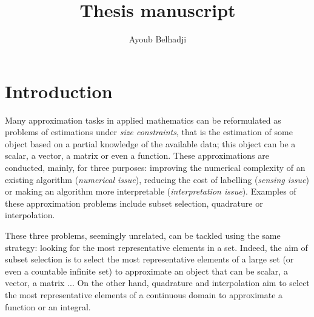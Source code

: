 \documentclass[twoside,11pt]{book}
\numberwithin{theorem}{chapter}
\numberwithin{definition}{chapter}
\numberwithin{proposition}{chapter}
\numberwithin{corollary}{chapter}
\numberwithin{example}{chapter}
\numberwithin{lemma}{chapter}
\numberwithin{assumption}{chapter}
\numberwithin{equation}{chapter}
\numberwithin{figure}{chapter}
\begin{document}
\title{Thesis manuscript}


\author{Ayoub Belhadji} %
 
\maketitle






\newpage
\chapter{Introduction}\label{chap:introduction}




Many approximation tasks in applied mathematics can be reformulated as problems of estimations under \emph{size constraints}, that is the estimation of some object based on a partial knowledge of the available data; this object can be a scalar, a vector, a matrix or even a function. These approximations are conducted, mainly, for three purposes: improving the numerical complexity of an existing algorithm (\emph{numerical issue}), reducing the cost of labelling (\emph{sensing issue}) or making an algorithm more interpretable (\emph{interpretation issue}). Examples of these approximation problems include subset selection, quadrature or interpolation. 


These three problems, seemingly unrelated, can be tackled using the same strategy: looking for the most representative elements in a set. Indeed,
the aim of subset selection is to select the most representative elements of a large set (or even a countable infinite set) to approximate an object that can be scalar, a vector, a matrix ... On the other hand, quadrature and interpolation aim to select the most representative elements of a continuous domain to approximate a function or an integral.
\end{document}
